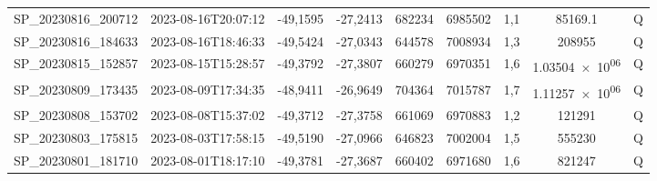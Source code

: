 \begin{center}
\begin{longtable}{ccccS[table-format=6.0]S[table-format=7.0]ccc}
SP\_20230816\_200712 & 2023-08-16T20:07:12 & -49,1595 & -27,2413 & 682234 & 6985502 & 1,1 & \num[round-precision=3,round-mode=figures,scientific-notation=true]{85169.1} & Q \\
SP\_20230816\_184633 & 2023-08-16T18:46:33 & -49,5424 & -27,0343 & 644578 & 7008934 & 1,3 & \num[round-precision=3,round-mode=figures,scientific-notation=true]{208955} & Q \\
SP\_20230815\_152857 & 2023-08-15T15:28:57 & -49,3792 & -27,3807 & 660279 & 6970351 & 1,6 & \num[round-precision=3,round-mode=figures,scientific-notation=true]{1.03504e+06} & Q \\
SP\_20230809\_173435 & 2023-08-09T17:34:35 & -48,9411 & -26,9649 & 704364 & 7015787 & 1,7 & \num[round-precision=3,round-mode=figures,scientific-notation=true]{1.11257e+06} & Q \\
SP\_20230808\_153702 & 2023-08-08T15:37:02 & -49,3712 & -27,3758 & 661069 & 6970883 & 1,2 & \num[round-precision=3,round-mode=figures,scientific-notation=true]{121291} & Q \\
SP\_20230803\_175815 & 2023-08-03T17:58:15 & -49,5190 & -27,0966 & 646823 & 7002004 & 1,5 & \num[round-precision=3,round-mode=figures,scientific-notation=true]{555230} & Q \\
SP\_20230801\_181710 & 2023-08-01T18:17:10 & -49,3781 & -27,3687 & 660402 & 6971680 & 1,6 & \num[round-precision=3,round-mode=figures,scientific-notation=true]{821247} & Q \\
\end{longtable}
\end{center}
